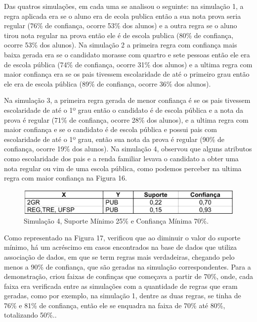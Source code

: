 \par
Das quatros simulações, em cada uma se analisou o seguinte: na simulação 1, a regra aplicada era se o aluno era de ecola publica então a sua nota prova seria regular (76\% de confiança, ocorre 53\% dos alunos) e a outra regra se o aluno tirou nota regular na prova então ele é de escola publica (80\% de confiança, ocorre 53\% dos alunos). Na simulação 2 a primeira regra com confiança mais baixa gerada era se o candidato morasse com quartro e sete pessoas então ele era de escola pública (74\% de confiança, ocorre 31\% dos alunos) e a ultima regra com maior confiança era se os pais tivessem escolaridade de até o primeiro grau então ele era de escola pública (89\% de confiança, ocorre 36\% dos alunos).

\par
Na simulação 3, a primeira regra gerada de menor confiança é se os pais tivessem escolaridade de até o 1º grau então o candidato é de escola pública e a nota da prova é regular (71\% de confiança, ocorre 28\% dos alunos), e a ultima regra com maior confiança e se o candidato é de escola pública e possui pais com escolaridade de até o 1º grau, então sua nota da prova é regular (90\% de confiança, ocorre 19\% dos alunos). Na simulação 4,  observou que alguns atributos como escolaridade dos pais e a renda familiar levava o candidato a obter uma nota regular ou vim de uma escola pública, como podemos perceber na ultima regra com maior confiança na Figura 16.


\begin{figure}[!htp]
	\begin{center}
    \caption{\label{fig:waveform_fig} Simulação 4, Suporte Mínimo 25\% e Confiança Mínima 70\%.}
	\includegraphics[scale=0.49]{Figuras/Simulacao_quatro.png}
	\end{center}
\end{figure}

\par
Como representado na Figura 17,  verificou que ao diminuir o valor do suporte mínimo, há um acréscimo em casos encontrados na base de dados que utiliza associação de dados, em que se term regras mais verdadeiras, chegando pelo menos a 90\% de confiança, que são geradas na simulação correspondentes. Para a demonstração,  criou faixas de confinças que começava a partir de 70\%, onde, cada faixa era verificada entre as simulações com a quantidade de regras que eram geradas, como por exemplo, na simulação 1, dentre as duas regras, se tinha de 76\% e 81\% de confiança, então ele se enquadra na faixa de 70\% até 80\%, totalizando 50\%..

